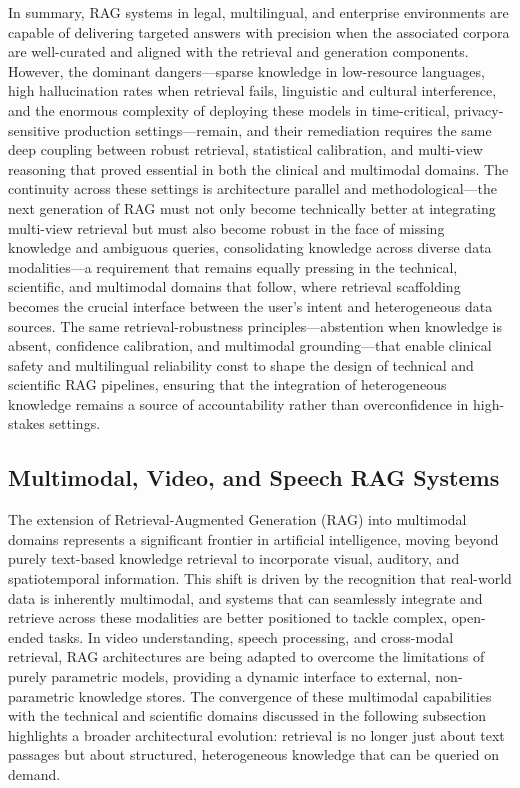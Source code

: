 \documentclass[11pt]{article}
\begin{document}
In summary, RAG systems in legal, multilingual, and enterprise environments are capable of delivering targeted answers with precision when the associated corpora are well-curated and aligned with the retrieval and generation components. However, the dominant dangers---sparse knowledge in low-resource languages, high hallucination rates when retrieval fails, linguistic and cultural interference, and the enormous complexity of deploying these models in time-critical, privacy-sensitive production settings---remain, and their remediation requires the same deep coupling between robust retrieval, statistical calibration, and multi-view reasoning that proved essential in both the clinical and multimodal domains\cite{ref125,ref190}. The continuity across these settings is architecture parallel and methodological---the next generation of RAG must not only become technically better at integrating multi-view retrieval \cite{ref182} but must also become robust in the face of missing knowledge and ambiguous queries, consolidating knowledge across diverse data modalities---a requirement that remains equally pressing in the technical, scientific, and multimodal domains that follow, where retrieval scaffolding becomes the crucial interface between the user's intent and heterogeneous data sources. The same retrieval-robustness principles---abstention when knowledge is absent, confidence calibration, and multimodal grounding---that enable clinical safety and multilingual reliability const to shape the design of technical and scientific RAG pipelines, ensuring that the integration of heterogeneous knowledge remains a source of accountability rather than overconfidence in high-stakes settings.

\subsection{Multimodal, Video, and Speech RAG Systems}

The extension of Retrieval-Augmented Generation (RAG) into multimodal domains represents a significant frontier in artificial intelligence, moving beyond purely text-based knowledge retrieval to incorporate visual, auditory, and spatiotemporal information. This shift is driven by the recognition that real-world data is inherently multimodal, and systems that can seamlessly integrate and retrieve across these modalities are better positioned to tackle complex, open-ended tasks. In video understanding, speech processing, and cross-modal retrieval, RAG architectures are being adapted to overcome the limitations of purely parametric models, providing a dynamic interface to external, non-parametric knowledge stores. The convergence of these multimodal capabilities with the technical and scientific domains discussed in the following subsection highlights a broader architectural evolution: retrieval is no longer just about text passages but about structured, heterogeneous knowledge that can be queried on demand.
\end{document}
